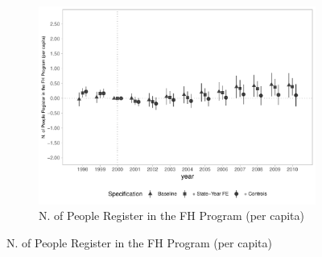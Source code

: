 \begin{figure}[h]
\begin{center}
    \begin{subfigure}{0.32\textwidth}
        \centering
        \caption{\scriptsize N. of People Register in the FH Program (per capita)}\label{fig:access1_e}
        \includegraphics[width=\textwidth]{plots/access/siab_regist_pers_psf_pcapita_dist_ec29_baseline_dist_ec29_baseline_full.pdf}
    \end{subfigure}
    
    
    \end{center}
    
\end{figure}


